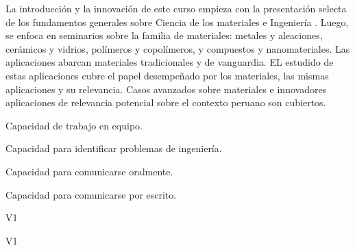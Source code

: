 \begin{syllabus}


\begin{justification}
La introducción y la innovación de este curso empieza con la presentación selecta de los fundamentos generales sobre Ciencia de los materiales e Ingeniería .
Luego, se enfoca en seminarios sobre la familia de materiales: metales y aleaciones, cerámicos y vidrios, polímeros y copolímeros, y compuestos y nanomateriales.
Las aplicaciones abarcan materiales tradicionales y de vanguardia. EL estudido de estas aplicaciones cubre el papel desempeñado por los materiales, 
las mismas aplicaciones y su relevancia. Casos avanzados sobre materiales e innovadores aplicaciones de relevancia potencial sobre el contexto peruano son cubiertos.

\end{justification}

\begin{goals}
\item Capacidad de trabajo en equipo.
\item Capacidad para identificar problemas de ingeniería.
\item Capacidad para comunicarse oralmente.
\item Capacidad para comunicarse por escrito.
\end{goals}

\begin{outcomes}{V1}
    \item {}
    \item {}
\end{outcomes}

\begin{competences}{V1}
    \item {}
\end{competences}


\end{syllabus}
